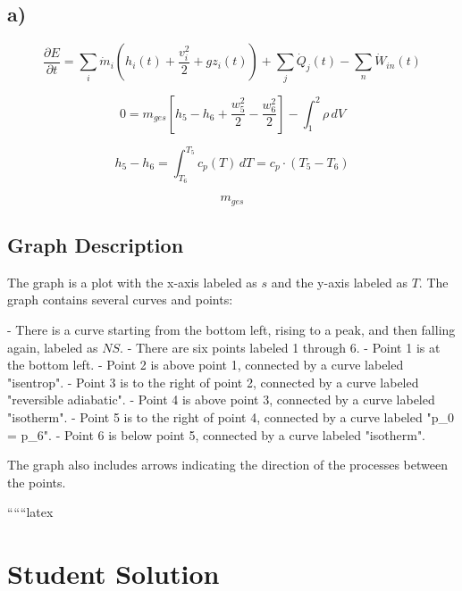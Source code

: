 

\subsection*{a)}

\begin{equation*}
\frac{\partial E}{\partial t} = \sum_i \dot{m}_i (h_i(t) + \frac{v_i^2}{2} + g z_i(t)) + \sum_j \dot{Q}_j(t) - \sum_n \dot{W}_{in}(t)
\end{equation*}

\begin{equation*}
0 = m_{ges} \left[ h_5 - h_6 + \frac{w_5^2}{2} - \frac{w_6^2}{2} \right] - \int_1^2 \rho \, dV
\end{equation*}

\begin{equation*}
h_5 - h_6 = \int_{T_6}^{T_5} c_p(T) \, dT = c_p \cdot (T_5 - T_6)
\end{equation*}

\begin{equation*}
m_{ges}
\end{equation*}

\subsection*{Graph Description}

The graph is a plot with the x-axis labeled as $s$ and the y-axis labeled as $T$. The graph contains several curves and points:

- There is a curve starting from the bottom left, rising to a peak, and then falling again, labeled as $NS$.
- There are six points labeled 1 through 6.
- Point 1 is at the bottom left.
- Point 2 is above point 1, connected by a curve labeled "isentrop".
- Point 3 is to the right of point 2, connected by a curve labeled "reversible adiabatic".
- Point 4 is above point 3, connected by a curve labeled "isotherm".
- Point 5 is to the right of point 4, connected by a curve labeled "p_0 = p_6".
- Point 6 is below point 5, connected by a curve labeled "isotherm".

The graph also includes arrows indicating the direction of the processes between the points.

``````latex


\section*{Student Solution}